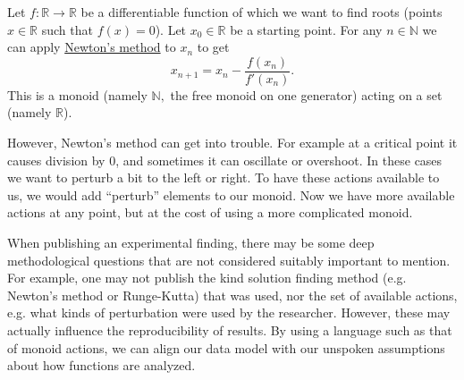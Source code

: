 \documentclass[../main/CT4S-EN-RU]{subfiles}
\begin{document}
\begin{applicationENG}
Let $f\colon{ℝ}{→}{ℝ}$ be a differentiable function of which we want to find roots (points $x\in{ℝ}$ such that $f(x)=0$). Let $x_0\in{ℝ}$ be a starting point. For any $n\in{ℕ}$ we can apply \href{http://en.wikipedia.org/wiki/Newton's_method}{\text Newton's method} to $x_n$ to get $$x_{n+1}=x_n-\frac{f(x_n)}{f'(x_n)}.$$
This is a monoid (namely ${ℕ},$ the free monoid on one generator) acting on a set (namely ${ℝ}$).

However, Newton's method can get into trouble. For example at a critical point it causes division by 0, and sometimes it can oscillate or overshoot. In these cases we want to perturb a bit to the left or right. To have these actions available to us, we would add “perturb” elements to our monoid. Now we have more available actions at any point, but at the cost of using a more complicated monoid.

When publishing an experimental finding, there may be some deep methodological questions that are not considered suitably important to mention. For example, one may not publish the kind solution finding method (e.g. Newton's method or Runge-Kutta) that was used, nor the set of available actions, e.g. what kinds of perturbation were used by the researcher. However, these may actually influence the reproducibility of results. By using a language such as that of monoid actions, we can align our data model with our unspoken assumptions about how functions are analyzed.
\end{applicationENG}
\end{document}
